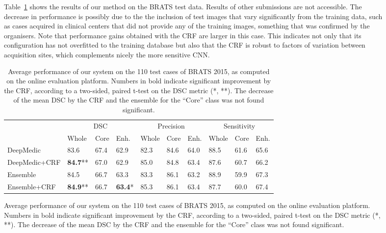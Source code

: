 \documentclass[preprint,authoryear,12pt]{elsarticle}
\newcommand{\quot}[1]{``#1''}
\begin{document}
\begin{figure}[h]
Table~\ref{table:onlineEvalBrats2015Testing} shows the results of our method on the BRATS test data. Results of other submissions are not accessible. The decrease in performance is possibly due to the the inclusion of test images that vary significantly from the training data, such as cases acquired in clinical centers that did not provide any of the training images, something that was confirmed by the organisers. Note that performance gains obtained with the CRF are larger in this case. This indicates not only that its configuration has not overfitted to the training database but also that the CRF is robust to factors of variation between acquisition sites, which complements nicely the more sensitive CNN.


\begin{table}[!h]
\centering
\scriptsize
\caption{Average performance of our system on the 110 test cases of BRATS 2015, as computed on the online evaluation platform. Numbers in bold indicate significant improvement by the CRF, according to a two-sided, paired t-test on the DSC metric (*, **). The decrease of the mean DSC by the CRF and the ensemble for the \quot{Core} class was not found significant.}
\label{table:onlineEvalBrats2015Testing}
\begin{tabular}{@{}llllllllll@{}}
\toprule
              & \multicolumn{3}{c}{DSC}  & \multicolumn{3}{c}{Precision} & \multicolumn{3}{c}{Sensitivity} \\ \cmidrule(l){2-10} 
              & Whole 			& Core & Enh. 			& Whole   & Core   & Enh.	& Whole    & Core   & Enh.   \\ \midrule

DeepMedic     & 83.6  			& 67.4 & 62.9      		& 82.3    & 84.6   & 64.0    & 88.5     & 61.6   & 65.6      \\
DeepMedic+CRF & \textbf{84.7}** 	& 67.0 & 62.9      		& 85.0    & 84.8   & 63.4    & 87.6     & 60.7   & 66.2      \\
Ensemble      & 84.5  			& 66.7 & 63.3      		& 83.3    & 86.1   & 63.2    & 88.9     & 59.9   & 67.3      \\
Ensemble+CRF  & \textbf{84.9}** 	& 66.7 & \textbf{63.4}* 	& 85.3    & 86.1   & 63.4    & 87.7     & 60.0   & 67.4		\\
\bottomrule
\end{tabular}
\end{table}


\end{figure}
\end{document}
